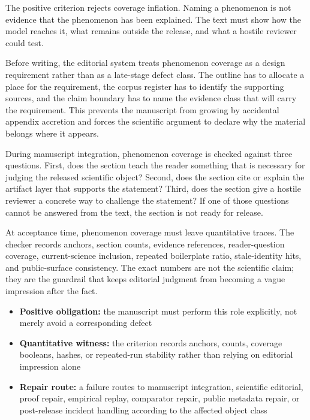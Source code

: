 The positive criterion rejects coverage inflation. Naming a phenomenon is not evidence that the phenomenon has been explained. The text must show how the model reaches it, what remains outside the release, and what a hostile reviewer could test.


Before writing, the editorial system treats phenomenon coverage as a design requirement rather than as a late-stage defect class. The outline has to allocate a place for the requirement, the corpus register has to identify the supporting sources, and the claim boundary has to name the evidence class that will carry the requirement. This prevents the manuscript from growing by accidental appendix accretion and forces the scientific argument to declare why the material belongs where it appears.


During manuscript integration, phenomenon coverage is checked against three questions. First, does the section teach the reader something that is necessary for judging the released scientific object? Second, does the section cite or explain the artifact layer that supports the statement? Third, does the section give a hostile reviewer a concrete way to challenge the statement? If one of those questions cannot be answered from the text, the section is not ready for release.


At acceptance time, phenomenon coverage must leave quantitative traces. The checker records anchors, section counts, evidence references, reader-question coverage, current-science inclusion, repeated boilerplate ratio, stale-identity hits, and public-surface consistency. The exact numbers are not the scientific claim; they are the guardrail that keeps editorial judgment from becoming a vague impression after the fact.


\begin{itemize}[leftmargin=1.8em]

\item \textbf{Positive obligation:} the manuscript must perform this role explicitly, not merely avoid a corresponding defect

\item \textbf{Quantitative witness:} the criterion records anchors, counts, coverage booleans, hashes, or repeated-run stability rather than relying on editorial impression alone

\item \textbf{Repair route:} a failure routes to manuscript integration, scientific editorial, proof repair, empirical replay, comparator repair, public metadata repair, or post-release incident handling according to the affected object class

\end{itemize}

